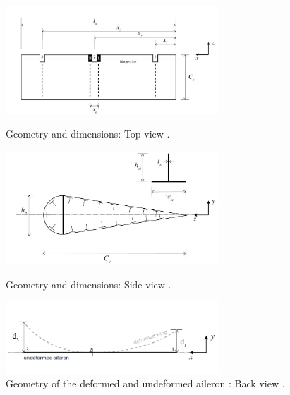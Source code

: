 \begin{figure}[H]
\begin{minipage}[b]{0.45\linewidth}
\centering
\includegraphics[width=8cm]{Images/Dimension_top_view.jpg}
\caption{Geometry and dimensions: Top view \cite{Assignment_description}.}
\label{fig:Dimensions_top_view}
\end{minipage}
\hspace{0.5cm}
\begin{minipage}[b]{0.45\linewidth}
\centering
\includegraphics[width=8cm]{Images/Dimension_side_view.jpg}
\caption{Geometry and dimensions: Side view \cite{Assignment_description}. }
\label{fig:Dimensions_side_view}
\end{minipage}
\begin{minipage}[b]{\linewidth}
\centering
\includegraphics[width=8cm]{Images/Dimension_back_view.jpg}
\caption{Geometry of the deformed and undeformed aileron : Back view \cite{Assignment_description}.}
\label{fig:Dimensions_back_view}
\end{minipage}
\end{figure}

